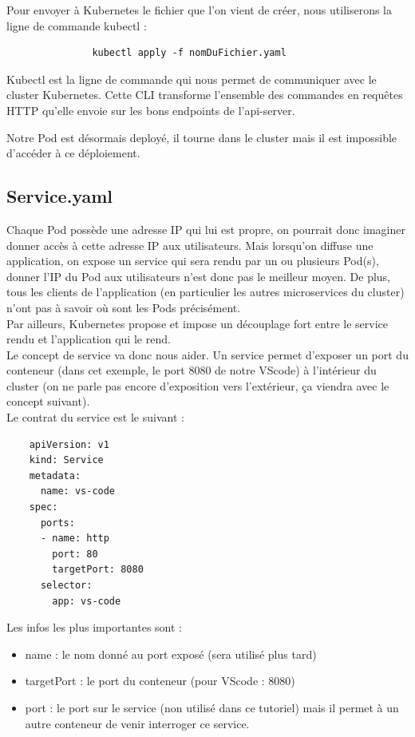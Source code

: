 \documentclass[11pt,fleqn]{book} %
\begin{document}
Pour envoyer à Kubernetes le fichier que l'on vient de créer, nous utiliserons la ligne de commande kubectl :
\begin{verbatim}
               kubectl apply -f nomDuFichier.yaml
\end{verbatim}
Kubectl est la ligne de commande qui nous permet de communiquer avec le cluster Kubernetes. Cette CLI transforme l'ensemble des commandes en requêtes HTTP qu'elle envoie sur les bons endpoints de l'api-server.\newline

Notre Pod est désormais deployé, il tourne dans le cluster mais il est impossible d'accéder à ce déploiement.
\subsection*{Service.yaml}
Chaque Pod possède une adresse IP qui lui est propre, on pourrait donc imaginer donner accès à cette adresse IP aux utilisateurs. Mais lorsqu'on diffuse une application, on expose un service qui sera rendu par un ou plusieurs Pod(s), donner l'IP du Pod aux utilisateurs n'est donc pas le meilleur moyen. De plus, tous les clients de l'application (en particulier les autres microservices du cluster) n'ont pas à savoir où sont les Pods précisément. \\

Par ailleurs, Kubernetes propose et impose un découplage fort entre le service rendu et l'application qui le rend. \\ 

Le concept de service va donc nous aider. Un service permet d'exposer un port du conteneur (dans cet exemple, le port 8080 de notre VScode) à l'intérieur du cluster (on ne parle pas encore d'exposition vers l'extérieur, ça viendra avec le concept suivant). \\
Le contrat du service est le suivant : 
\begin{verbatim}
    apiVersion: v1
    kind: Service
    metadata:
      name: vs-code
    spec:
      ports:
      - name: http
        port: 80
        targetPort: 8080
      selector:
        app: vs-code
\end{verbatim}
Les infos les plus importantes sont : 
\begin{itemize}
    \item name : le nom donné au port exposé (sera utilisé plus tard)
    \item targetPort : le port du conteneur (pour VScode : 8080)
    \item port : le port sur le service (non utilisé dans ce tutoriel) mais il permet à un autre conteneur de venir interroger ce service.\\
\end{itemize}
\end{document}
